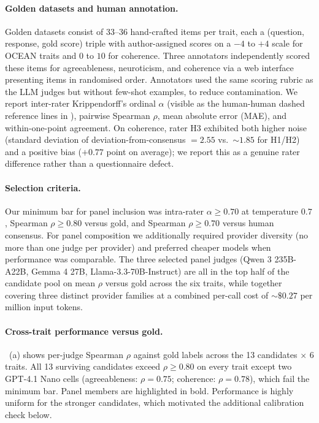 \paragraph{Golden datasets and human annotation.}
Golden datasets consist of 33--36 hand-crafted items per trait, each a (question, response, gold score) triple with author-assigned scores on a $-4$ to $+4$ scale for OCEAN traits and $0$ to $10$ for coherence. Three annotators independently scored these items for agreeableness, neuroticism, and coherence via a web interface presenting items in randomised order. Annotators used the same scoring rubric as the LLM judges but without few-shot examples, to reduce contamination. We report inter-rater Krippendorff's ordinal $\alpha$ (visible as the human-human dashed reference lines in ), pairwise Spearman $\rho$, mean absolute error (MAE), and within-one-point agreement. On coherence, rater H3 exhibited both higher noise (standard deviation of deviation-from-consensus $= 2.55$ vs.\ $\sim 1.85$ for H1/H2) and a positive bias ($+0.77$ point on average); we report this as a genuine rater difference rather than a questionnaire defect.

\paragraph{Selection criteria.}
Our minimum bar for panel inclusion was intra-rater $\alpha \geq 0.70$ at temperature $0.7$, Spearman $\rho \geq 0.80$ versus gold, and Spearman $\rho \geq 0.70$ versus human consensus. For panel composition we additionally required provider diversity (no more than one judge per provider) and preferred cheaper models when performance was comparable. The three selected panel judges (Qwen 3 235B-A22B, Gemma 4 27B, Llama-3.3-70B-Instruct) are all in the top half of the candidate pool on mean $\rho$ versus gold across the six traits, while together covering three distinct provider families at a combined per-call cost of $\sim\$0.27$ per million input tokens.

\paragraph{Cross-trait performance versus gold.}
~(a) shows per-judge Spearman $\rho$ against gold labels across the 13 candidates $\times$ 6 traits. All 13 surviving candidates exceed $\rho \geq 0.80$ on every trait except two GPT-4.1 Nano cells (agreeableness: $\rho = 0.75$; coherence: $\rho = 0.78$), which fail the minimum bar. Panel members are highlighted in bold. Performance is highly uniform for the stronger candidates, which motivated the additional calibration check below.

